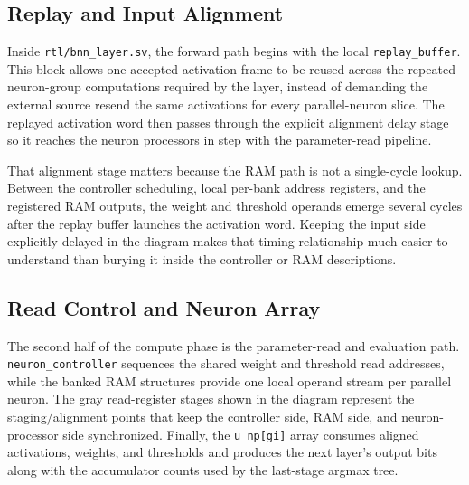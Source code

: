 \clearpage
\begin{strip}
  \centering
  \resizebox{!}{0.72\textheight}{}
  \label{fig:data-in-manager}
\end{strip}
\clearpage

\clearpage
\begin{strip}
  \begin{minipage}[t]{0.48\textwidth}
    \subsection{Replay and Input Alignment}

    Inside \texttt{rtl/bnn\_layer.sv}, the forward path begins with the local
    \texttt{replay\_buffer}. This block allows one accepted activation frame to
    be reused across the repeated neuron-group computations required by the
    layer, instead of demanding the external source resend the same activations
    for every parallel-neuron slice. The replayed activation word then passes
    through the explicit alignment delay stage so it reaches the neuron
    processors in step with the parameter-read pipeline.

    That alignment stage matters because the RAM path is not a single-cycle
    lookup. Between the controller scheduling, local per-bank address registers,
    and the registered RAM outputs, the weight and threshold operands emerge
    several cycles after the replay buffer launches the activation word.
    Keeping the input side explicitly delayed in the diagram makes that timing
    relationship much easier to understand than burying it inside the
    controller or RAM descriptions.
  \end{minipage}\hfill
  \begin{minipage}[t]{0.48\textwidth}
    \subsection{Read Control and Neuron Array}

    The second half of the compute phase is the parameter-read and evaluation
    path. \texttt{neuron\_controller} sequences the shared weight and threshold
    read addresses, while the banked RAM structures provide one local operand
    stream per parallel neuron. The gray read-register stages shown in the
    diagram represent the staging/alignment points that keep the controller
    side, RAM side, and neuron-processor side synchronized. Finally, the
    \texttt{u\_np[gi]} array consumes aligned activations, weights, and
    thresholds and produces the next layer's output bits along with the
    accumulator counts used by the last-stage argmax tree.


\end{minipage}
\end{strip}
